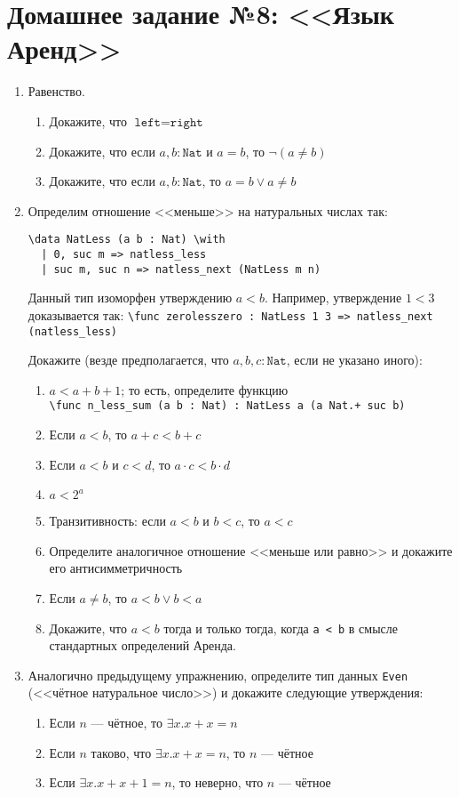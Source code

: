 \documentclass[10pt,a4paper,oneside]{article}
\begin{document}
\section*{Домашнее задание №8: <<Язык Аренд>>}
\begin{enumerate}
\item Равенство.
\begin{enumerate}
\item Докажите, что $\texttt{left}=\texttt{right}$
\item Докажите, что если $a,b : \texttt{Nat}$ и $a = b$, то $\neg (a \ne b)$
\item Докажите, что если $a,b : \texttt{Nat}$, то $a = b \vee a \ne b$
\end{enumerate} 

\item Определим отношение <<меньше>> на натуральных числах так:
\begin{verbatim}
\data NatLess (a b : Nat) \with
  | 0, suc m => natless_less
  | suc m, suc n => natless_next (NatLess m n)
\end{verbatim}

Данный тип изоморфен утверждению $a < b$. Например, утверждение $1 < 3$ доказывается так:
\verb!\func zerolesszero : NatLess 1 3 => natless_next (natless_less)!

Докажите (везде предполагается, что $a,b,c : \texttt{Nat}$, если не указано иного):
\begin{enumerate}
\item $a < a + b + 1$; то есть, определите функцию\\\verb!\func n_less_sum (a b : Nat) : NatLess a (a Nat.+ suc b)!
\item Если $a < b$, то $a + c < b + c$
\item Если $a < b$ и $c < d$, то $a \cdot c < b \cdot d$
\item $a < 2^a$
\item Транзитивность: если $a < b$ и $b < c$, то $a < c$
\item Определите аналогичное отношение <<меньше или равно>> и докажите его антисимметричность
\item Если $a \ne b$, то $a < b \vee b < a$
\item Докажите, что $a < b$ тогда и только тогда, когда \verb!a < b! в смысле стандартных определений Аренда.
\end{enumerate}

\item Аналогично предыдущему упражнению, определите тип данных \verb!Even!
(<<чётное натуральное число>>) и докажите следующие утверждения:
\begin{enumerate}
\item Если $n$ --- чётное, то $\exists x.x + x = n$
\item Если $n$ таково, что $\exists x.x+x = n$, то $n$ --- чётное
\item Если $\exists x.x + x + 1 = n$, то неверно, что $n$ --- чётное
\end{enumerate}


\end{enumerate}
\end{document}
